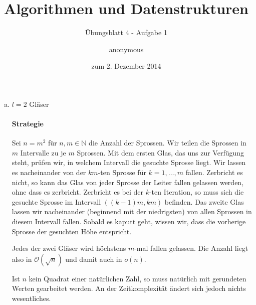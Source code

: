 \documentclass[a4paper]{scrartcl}
\title{Algorithmen und Datenstrukturen}
\subtitle{Übungsblatt 4 - Aufgabe 1}
\author{
    anonymous
}
\date{zum 2. Dezember 2014}
\begin{document}
\maketitle

\begin{enumerate}[(a)]
    \item $l=2$ Gläser
        \paragraph{Strategie}
        Sei $n = m^2$ für $n, m \in \mathbb{N}$ die Anzahl der Sprossen.
        Wir teilen die Sprossen in $m$ Intervalle zu je $m$ Sprossen.
        Mit dem ersten Glas, das uns zur Verfügung steht, prüfen wir, in
        welchem Intervall die gesuchte Sprosse liegt.
        Wir lassen es nacheinander von der $km$-ten Sprosse für
        $k = 1, \ldots, m$ fallen.
        Zerbricht es nicht, so kann das Glas von jeder Sprosse der Leiter
        fallen gelassen werden, ohne dass es zerbricht.
        Zerbricht es bei der $k$-ten Iteration, so muss sich die gesuchte
        Sprosse im Intervall $\left( (k-1)m, km \right)$ befinden.
        Das zweite Glas lassen wir nacheinander (beginnend mit der niedrigsten)
        von allen Sprossen in diesem Intervall fallen.
        Sobald es kaputt geht, wissen wir, dass die vorherige Sprosse der
        gesuchten Höhe entspricht.

        Jedes der zwei Gläser wird höchstens $m$-mal fallen gelassen.
        Die Anzahl liegt also in $\mathcal{O}(\sqrt{n})$ und damit auch in
        $o(n)$.

        Ist $n$ kein Quadrat einer natürlichen Zahl, so muss natürlich mit
        gerundeten Werten gearbeitet werden.
        An der Zeitkomplexität ändert sich jedoch nichts wesentliches.





\end{enumerate}
\end{document}
